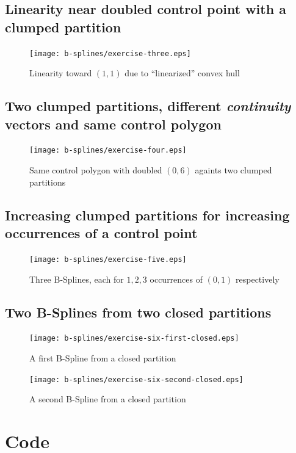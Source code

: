 \documentclass{article}
\begin{document}
\subsection{Linearity near doubled control point with a clumped partition}
\begin{figure}[h!]
  \centering
  \texttt{[image: b-splines/exercise-three.eps]}
  \caption{Linearity toward $(1,1)$ due to ``linearized'' convex hull}
  \label{fig:bspline-exercise-three}
\end{figure}

\subsection{Two clumped partitions, different \emph{continuity} vectors and same control polygon}
\begin{figure}[h!]
  \centering
  \texttt{[image: b-splines/exercise-four.eps]}
  \caption{Same control polygon with doubled $(0,6)$ againts two clumped partitions}
  \label{fig:bspline-exercise-four}
\end{figure}

\subsection{Increasing clumped partitions for increasing occurrences of a control point}
\begin{figure}[h!]
  \centering
  \texttt{[image: b-splines/exercise-five.eps]}
  \caption{Three B-Splines, each for $1,2,3$ occurrences of $(0,1)$ respectively }
  \label{fig:bspline-exercise-five}
\end{figure}

\subsection{Two B-Splines from two closed partitions}
\begin{figure}[h!]
  \centering
  \texttt{[image: b-splines/exercise-six-first-closed.eps]}
  \caption{A first B-Spline from a closed partition }
  \label{fig:bspline-exercise-six-first}
\end{figure}

\begin{figure}[h!]
  \centering
  \texttt{[image: b-splines/exercise-six-second-closed.eps]}
  \caption{A second B-Spline from a closed partition }
  \label{fig:bspline-exercise-six-second}
\end{figure}


\section{Code}
\end{document}
